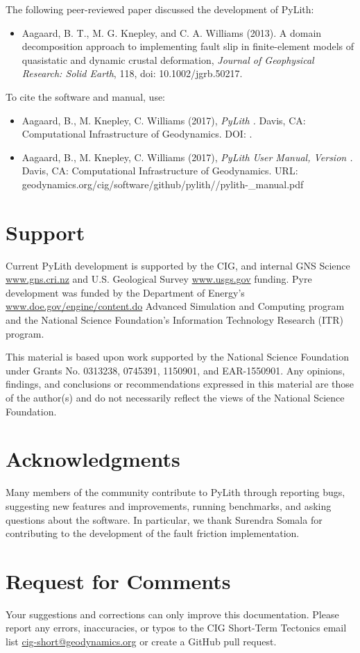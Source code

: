 The following peer-reviewed paper discussed the development of PyLith:
\begin{itemize}
\item Aagaard, B. T., M. G. Knepley, and C. A. Williams (2013). A
  domain decomposition approach to implementing fault slip in
  finite-element models of quasistatic and dynamic crustal
  deformation, \textit{Journal of Geophysical Research: Solid Earth},
  118, doi: 10.1002/jgrb.50217.
\end{itemize}
To cite the software and manual, use:
\begin{itemize}
\item Aagaard, B., M. Knepley, C. Williams (2017), \emph{PyLith
  \pylithVersion.} Davis, CA: Computational Infrastructure of
  Geodynamics. DOI: \pylithDOI.
\item Aagaard, B., M. Knepley, C. Williams (2017), \emph{PyLith User
  Manual, Version \pylithVersionNumber.} Davis, CA: Computational
  Infrastructure of Geodynamics. URL:
  geodynamics.org/cig/software/github/pylith/\pylithVersion/pylith-\pylithVersionNumber\_manual.pdf
\end{itemize}

\section{Support}

Current PyLith development is supported by the CIG, and internal GNS
Science \url{www.gns.cri.nz} and U.S. Geological Survey \url{www.usgs.gov}
funding. Pyre development was funded by the Department of Energy's
\url{www.doe.gov/engine/content.do} Advanced Simulation and Computing
program and the National Science Foundation's Information Technology
Research (ITR) program.

This material is based upon work supported by the National Science
Foundation under Grants No. 0313238, 0745391, 1150901, and
EAR-1550901. Any opinions, findings, and conclusions or
recommendations expressed in this material are those of the author(s)
and do not necessarily reflect the views of the National Science
Foundation.


\section{Acknowledgments}

Many members of the community contribute to PyLith through reporting
bugs, suggesting new features and improvements, running benchmarks,
and asking questions about the software. In particular, we thank Surendra
Somala for contributing to the development of the fault friction implementation.


\section{Request for Comments}

Your suggestions and corrections can only improve this documentation.
Please report any errors, inaccuracies, or typos to the CIG Short-Term
Tectonics email list \url{cig-short@geodynamics.org} or create a
GitHub pull request.
